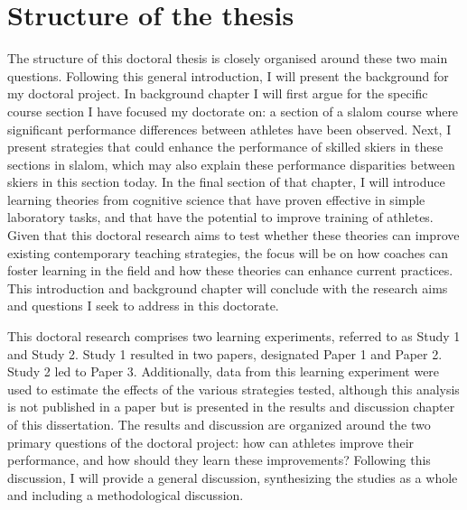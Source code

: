 \section{Structure of the thesis}
The structure of this doctoral thesis is closely organised around these two main questions. Following this general introduction, I will present the background for my doctoral project. In background chapter I will first argue for the specific course section I have focused my doctorate on: a section of a slalom course where significant performance differences between athletes have been observed. Next, I present strategies that could enhance the performance of skilled skiers in these sections in slalom, which may also explain these performance disparities between skiers in this section today. In the final section of that chapter, I will introduce learning theories from cognitive science that have proven effective in simple laboratory tasks, and that have the potential to improve training of athletes. Given that this doctoral research aims to test whether these theories can improve existing contemporary teaching strategies, the focus will be on how coaches can foster learning in the field and how these theories can enhance current practices. This introduction and background chapter will conclude with the research aims and questions I seek to address in this doctorate.

This doctoral research comprises two learning experiments, referred to as Study 1 and Study 2. Study 1 resulted in two papers, designated Paper 1 and Paper 2. Study 2 led to Paper 3. Additionally, data from this learning experiment were used to estimate the effects of the various strategies tested, although this analysis is not published in a paper but is presented in the results and discussion chapter of this dissertation. The results and discussion are organized around the two primary questions of the doctoral project: how can athletes improve their performance, and how should they learn these improvements? Following this discussion, I will provide a general discussion, synthesizing the studies as a whole and including a methodological discussion.



